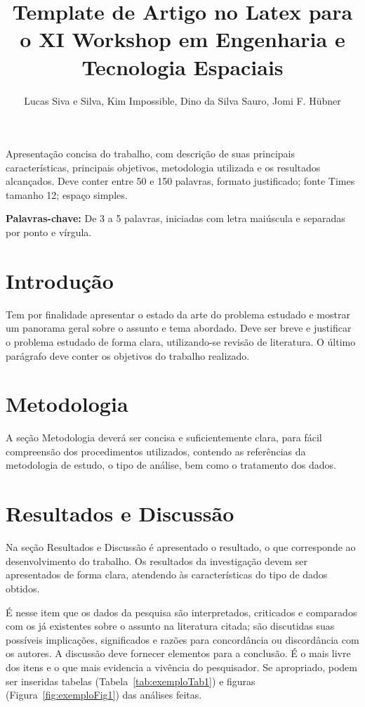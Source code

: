 \documentclass[12pt]{article}
\title{Template de Artigo no Latex para o XI Workshop em Engenharia e Tecnologia Espaciais}
\author{Lucas Siva e Silva\inst{1}, Kim Impossible\inst{2}, Dino da Silva Sauro\inst{1}, Jomi F. Hübner\inst{3} }
\begin{document}
 

\maketitle

\begin{resumo}
Apresentação concisa do trabalho, com descrição de suas principais características, principais objetivos, metodologia utilizada e os resultados alcançados. Deve conter entre 50 e 150 palavras, formato justificado; fonte Times tamanho 12; espaço simples.
\end{resumo}
\hrulefill

\begin{flushleft}
\textbf{Palavras-chave:} De 3 a 5 palavras, iniciadas com letra maiúscula e separadas por ponto e vírgula.
\end{flushleft}

\section{Introdução}

Tem por finalidade apresentar o estado da arte do problema estudado e mostrar um panorama geral sobre o assunto e tema abordado. Deve ser breve e justificar o problema estudado de forma clara, utilizando-se revisão de literatura. O último parágrafo deve conter os objetivos do trabalho realizado.

\section{Metodologia} \label{sec:met}

A seção Metodologia deverá ser concisa e suficientemente clara, para fácil compreensão dos procedimentos utilizados, contendo as referências da metodologia de estudo, o tipo de análise, bem como o tratamento dos dados.

\section{Resultados e Discussão}

Na seção Resultados e Discussão é apresentado o resultado, o que corresponde ao desenvolvimento do trabalho. Os resultados da investigação devem ser apresentados de forma clara, atendendo às características do tipo de dados obtidos. 

É nesse item que os dados da pesquisa são interpretados, criticados e comparados com os já existentes sobre o assunto na literatura citada; são discutidas suas possíveis implicações, significados e razões para concordância ou discordância com os autores. A discussão deve fornecer elementos para a conclusão. É o mais livre dos itens e o que mais evidencia a vivência do pesquisador. Se apropriado, podem ser inseridas tabelas (Tabela~\ref{tab:exemploTab1}) e figuras (Figura~\ref{fig:exemploFig1}) das análises feitas.
\end{document}
